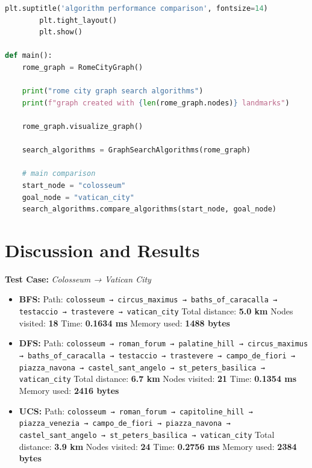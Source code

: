 \documentclass{article}
\begin{document}
\begin{lstlisting}[language=Python, caption={Rome City Path Finding}]
        plt.suptitle('algorithm performance comparison', fontsize=14)
        plt.tight_layout()
        plt.show()

def main():
    rome_graph = RomeCityGraph()
    
    print("rome city graph search algorithms")
    print(f"graph created with {len(rome_graph.nodes)} landmarks")
    
    rome_graph.visualize_graph()
    
    search_algorithms = GraphSearchAlgorithms(rome_graph)
    
    # main comparison
    start_node = "colosseum"
    goal_node = "vatican_city"
    search_algorithms.compare_algorithms(start_node, goal_node)


\end{lstlisting}
\section*{Discussion and Results}

\noindent
\textbf{Test Case:} \textit{Colosseum → Vatican City}

\vspace{0.3cm}
\begin{itemize}
    \item \textbf{BFS:}
          Path:
          \texttt{colosseum → circus\_maximus → baths\_of\_caracalla → testaccio → trastevere → vatican\_city}
          Total distance: \textbf{5.0 km}
          Nodes visited: \textbf{18}
          Time: \textbf{0.1634 ms}
          Memory used: \textbf{1488 bytes}

    \item \textbf{DFS:}
          Path:
          \texttt{colosseum → roman\_forum → palatine\_hill → circus\_maximus → baths\_of\_caracalla → testaccio → trastevere → campo\_de\_fiori → piazza\_navona → castel\_sant\_angelo → st\_peters\_basilica → vatican\_city}
          Total distance: \textbf{6.7 km}
          Nodes visited: \textbf{21}
          Time: \textbf{0.1354 ms}
          Memory used: \textbf{2416 bytes}

    \item \textbf{UCS:}
          Path:
          \texttt{colosseum → roman\_forum → capitoline\_hill → piazza\_venezia → campo\_de\_fiori → piazza\_navona → castel\_sant\_angelo → st\_peters\_basilica → vatican\_city}
          Total distance: \textbf{3.9 km}
          Nodes visited: \textbf{24}
          Time: \textbf{0.2756 ms}
          Memory used: \textbf{2384 bytes}
\end{itemize}
\end{document}
